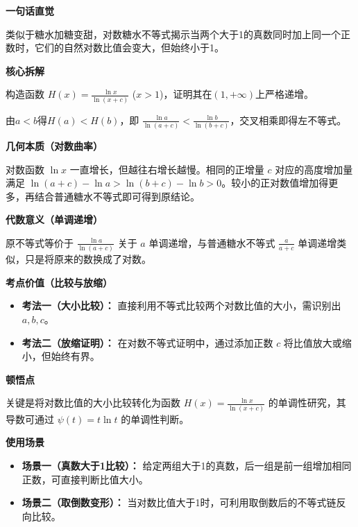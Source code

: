 \begin{explanationbox}
	\textbf{\textcolor{CExplanation}{一句话直觉}}

	类似于糖水加糖变甜，对数糖水不等式揭示当两个大于1的真数同时加上同一个正数时，它们的自然对数比值会变大，但始终小于1。

	\medskip
	\textbf{\textcolor{CExplanation}{核心拆解}}
	\begin{description}[style=nextline, leftmargin=2.8em, labelsep=0.5em, itemsep=0.45em]
		\item[\textbf{要点一（函数构造）：}] 构造函数 $H(x)=\frac{\ln x}{\ln(x+c)}$ ($x>1$)，证明其在$(1,+\infty)$上严格递增。
		\item[\textbf{要点二（单调应用）：}] 由$a<b$得$H(a)<H(b)$，即 $\frac{\ln a}{\ln(a+c)}<\frac{\ln b}{\ln(b+c)}$，交叉相乘即得左不等式。
	\end{description}

	\medskip
	\textbf{\textcolor{CExplanation}{几何本质（对数曲率）}}

	对数函数 $\ln x$ 一直增长，但越往右增长越慢。相同的正增量 $c$ 对应的高度增加量满足 $\ln(a+c)-\ln a>\ln(b+c)-\ln b>0$。较小的正对数值增加得更多，再结合普通糖水不等式即可得到原结论。

	\medskip
	\textbf{\textcolor{CExplanation}{代数意义（单调递增）}}

	原不等式等价于 $\frac{\ln a}{\ln(a+c)}$ 关于 $a$ 单调递增，与普通糖水不等式 $\frac{a}{a+c}$ 单调递增类似，只是将原来的数换成了对数。

	\medskip
	\textbf{\textcolor{CExplanation}{考点价值（比较与放缩）}}
	\begin{itemize}[leftmargin=*, itemsep=0.5em, topsep=0.4em]
		\item \textbf{考法一（大小比较）：} 直接利用不等式比较两个对数比值的大小，需识别出 $a,b,c$。
		\item \textbf{考法二（放缩证明）：} 在对数不等式证明中，通过添加正数 $c$ 将比值放大或缩小，但始终有界。
	\end{itemize}

	\medskip
	\textbf{\textcolor{CExplanation}{顿悟点}}

	关键是将对数比值的大小比较转化为函数 $H(x)=\frac{\ln x}{\ln(x+c)}$ 的单调性研究，其导数可通过 $\psi(t)=t\ln t$ 的单调性判断。

	\medskip
	\textbf{\textcolor{CExplanation}{使用场景}}
	\begin{itemize}[leftmargin=*, itemsep=0.5em, topsep=0.4em]
		\item \textbf{场景一（真数大于1比较）：} 给定两组大于1的真数，后一组是前一组增加相同正数，可直接判断比值大小。
		\item \textbf{场景二（取倒数变形）：} 当对数比值大于1时，可利用取倒数后的不等式链反向比较。
	\end{itemize}
\end{explanationbox}
